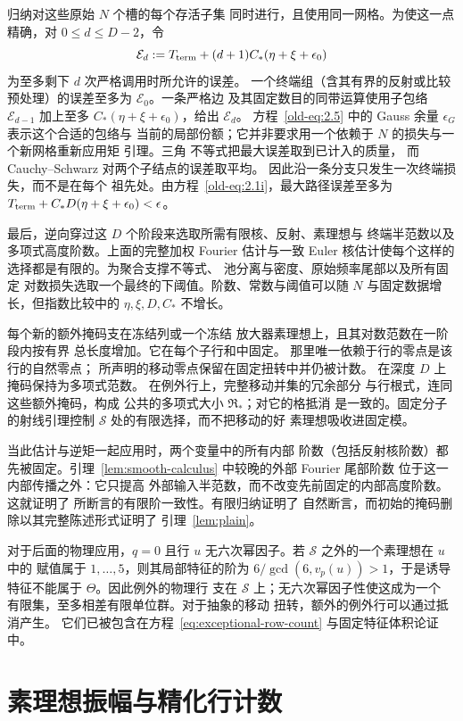归纳对这些原始 \(N\) 个槽的每个存活子集
同时进行，且使用同一网格。为使这一点精确，对
\(0\le d\le D-2\)，令
\[
 \mathcal E_d
 :=T_{\rm term}+(d+1)C_*(\eta+\xi+\epsilon_0)
\]
为至多剩下 \(d\) 次严格调用时所允许的误差。
一个终端组（含其有界的反射或比较
预处理）的误差至多为 \(\mathcal E_0\)。一条严格边
及其固定数目的同带运算使用子包络
\(\mathcal E_{d-1}\) 加上至多
\(C_*(\eta+\xi+\epsilon_0)\)，给出 \(\mathcal E_d\)。
方程~\eqref{old-eq:2.5} 中的 Gauss 余量 \(\epsilon_G\) 表示这个合适的包络与
当前的局部份额；它并非要求用一个依赖于 \(N\) 的损失与一个新网格重新应用矩
引理。三角
不等式把最大误差取到已计入的质量，
而 Cauchy--Schwarz 对两个子结点的误差取平均。
因此沿一条分支只发生一次终端损失，而不是在每个
祖先处。由方程~\eqref{old-eq:2.1i}，最大路径误差至多为
\(T_{\rm term}+C_*D(\eta+\xi+\epsilon_0)<\epsilon\)。

最后，逆向穿过这 \(D\) 个阶段来选取所需有限核、反射、素理想与
终端半范数以及多项式高度阶数。上面的完整加权 Fourier 估计与一致
Euler 核估计使每个这样的选择都是有限的。为聚合支撑不等式、
池分离与密度、原始频率尾部以及所有固定
对数损失选取一个最终的下阈值。阶数、常数与阈值可以随
\(N\) 与固定数据增长，但指数比较中的 \(\eta,\xi,D,C_*\)
不增长。

每个新的额外掩码支在冻结列或一个冻结
放大器素理想上，且其对数范数在一阶段内按有界
总长度增加。它在每个子行和中固定。
那里唯一依赖于行的零点是该行的自然零点；
所声明的移动零点保留在固定扭转中并仍被计数。
在深度 \(D\) 上掩码保持为多项式范数。
在例外行上，完整移动并集的冗余部分
与行根式，连同这些额外掩码，构成
公共的多项式大小 \(\mathfrak R_*\)；对它的格抵消
是一致的。固定分子的射线引理控制
\(\mathcal S\) 处的有限选择，而不把移动的好
素理想吸收进固定模。

当此估计与逆矩一起应用时，两个变量中的所有内部
阶数（包括反射核阶数）都先被固定。引理~\ref{lem:smooth-calculus} 中较晚的外部 Fourier 尾部阶数
位于这一内部传播之外：它只提高
外部输入半范数，而不改变先前固定的内部高度阶数。这就证明了
所断言的有限阶一致性。有限归纳证明了
自然断言，而初始的掩码删除以其完整陈述形式证明了
引理~\ref{lem:plain}。

对于后面的物理应用，\(q=0\) 且行 \(u\)
无六次幂因子。若 \(\mathcal S\) 之外的一个素理想在 \(u\) 中的
赋值属于 \(1,\ldots,5\)，则其局部特征的阶为
\(6/\gcd(6,v_p(u))>1\)，于是诱导特征不能属于
\(\Theta\)。因此例外的物理行
支在 \(\mathcal S\) 上；无六次幂因子性使这成为一个
有限集，至多相差有限单位群。对于抽象的移动
扭转，额外的例外行可以通过抵消产生。
它们已被包含在方程~\eqref{eq:exceptional-row-count}
与固定特征体积论证中。
\section{素理想振幅与精化行计数}\label{sec:refined-row-counts}

